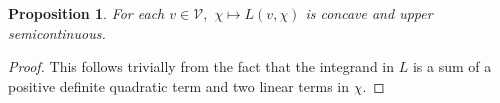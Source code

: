 \documentclass[11pt]{article}
\newtheorem{proposition}[theorem]{Proposition}
\begin{document}
\begin{proposition}
\label{usc}
For each $v\in \mathcal{V},$ $\chi\mapsto L(v,\chi)$ is concave and upper semicontinuous.
\end{proposition}
\begin{proof} 
This follows trivially from the fact that the integrand in $L$ is a sum of a positive definite quadratic term and two linear terms in $\chi$.
%
%
\end{proof}
\end{document}
